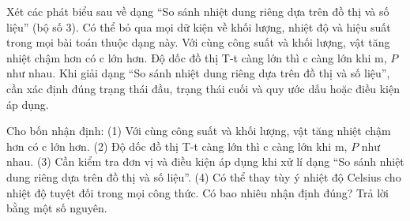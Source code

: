 \begin{ex}
Xét các phát biểu sau về dạng “So sánh nhiệt dung riêng dựa trên đồ thị và số liệu” (bộ số 3).
\choiceTF
{Có thể bỏ qua mọi dữ kiện về khối lượng, nhiệt độ và hiệu suất trong mọi bài toán thuộc dạng này.}
{\True Với cùng công suất và khối lượng, vật tăng nhiệt chậm hơn có c lớn hơn.}
{Độ dốc đồ thị T-t càng lớn thì c càng lớn khi m, $P$ như nhau.}
{\True Khi giải dạng “So sánh nhiệt dung riêng dựa trên đồ thị và số liệu”, cần xác định đúng trạng thái đầu, trạng thái cuối và quy ước dấu hoặc điều kiện áp dụng.}
\end{ex}

\begin{ex}
Cho bốn nhận định: (1) Với cùng công suất và khối lượng, vật tăng nhiệt chậm hơn có c lớn hơn. (2) Độ dốc đồ thị T-t càng lớn thì c càng lớn khi m, $P$ như nhau. (3) Cần kiểm tra đơn vị và điều kiện áp dụng khi xử lí dạng “So sánh nhiệt dung riêng dựa trên đồ thị và số liệu”. (4) Có thể thay tùy ý nhiệt độ Celsius cho nhiệt độ tuyệt đối trong mọi công thức. Có bao nhiêu nhận định đúng? Trả lời bằng một số nguyên.
\end{ex}

